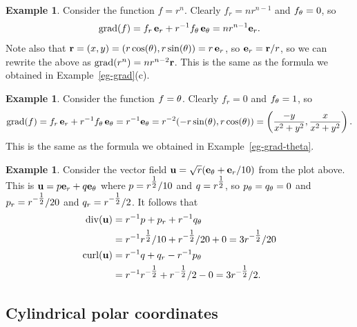 \documentclass[reqno]{amsart}
\theoremstyle{definition}
\newtheorem{example}[theorem]{Example}
\begin{document}
\begin{example}
 Consider the function $f=r^n$.  Clearly $f_r=nr^{n-1}$ and
 $f_\theta=0$, so 
 \[ \operatorname{grad}(f) = f_r\,\mathbf{e}_r + r^{-1}f_\theta\,\mathbf{e}_\theta 
     = nr^{n-1}\mathbf{e}_r.
 \]
 Note also that $\mathbf{r}=(x,y)=(r\cos(\theta),r\sin(\theta))=r\,\mathbf{e}_r$, so
 $\mathbf{e}_r=\mathbf{r}/r$, so we can rewrite the above as
 $\operatorname{grad}(r^n)=nr^{n-2}\mathbf{r}$.  This is the same as the formula we
 obtained in Example~\ref{eg-grad}(c).
\end{example}
\begin{example}
 Consider the function $f=\theta$.  Clearly $f_r=0$ and
 $f_\theta=1$, so 
 \[ \operatorname{grad}(f) = f_r\,\mathbf{e}_r + r^{-1}f_\theta\,\mathbf{e}_\theta 
     = r^{-1}\mathbf{e}_\theta = r^{-2}(-r\sin(\theta),r\cos(\theta)) 
     = \left(\frac{-y}{x^2+y^2},\frac{x}{x^2+y^2}\right).
 \]
 This is the same as the formula we obtained in
 Example~\ref{eg-grad-theta}. 
\end{example}
\begin{example}
 Consider the vector field $\mathbf{u}=\sqrt{r}(\mathbf{e}_\theta+\mathbf{e}_r/10)$ from the
 plot above.  This is $\mathbf{u}=p\mathbf{e}_r+q\mathbf{e}_\theta$ where $p=r^{\tfrac{1}{2}}/10$
 and $q=r^{\tfrac{1}{2}}$, so $p_\theta=q_\theta=0$ and $p_r=r^{-\tfrac{1}{2}}/20$ and
 $q_r=r^{-\tfrac{1}{2}}/2$.  It follows that 
 \begin{align*}
  \operatorname{div}(\mathbf{u})   &= r^{-1}p + p_r + r^{-1}q_\theta \\
   &= r^{-1}r^{\tfrac{1}{2}}/10 + r^{-\tfrac{1}{2}}/20 + 0 = 3r^{-\tfrac{1}{2}}/20 \\
  \operatorname{curl}(\mathbf{u}) &= r^{-1}q + q_r - r^{-1}p_\theta \\
   &= r^{-1}r^{-\tfrac{1}{2}} + r^{-\tfrac{1}{2}}/2 - 0 = 3r^{-\tfrac{1}{2}}/2.
 \end{align*}
\end{example}

\subsection{Cylindrical polar coordinates}
\label{subsec-polar-fields-cyl}
\end{document}
